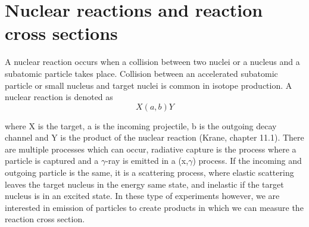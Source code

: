 \documentclass[a4paper,11pt,twoside]{book}
\begin{document}



\section{Nuclear reactions and reaction cross sections}

A nuclear reaction occurs when a collision between two nuclei or a nucleus and a subatomic particle takes place. Collision between an accelerated subatomic particle or small nucleus and target nuclei is common in isotope production. A nuclear reaction is denoted as
\begin{equation}
    X(a,b)Y
\end{equation}

\noindent where X is the target, a is the incoming projectile, b is the outgoing decay channel and Y is the product of the nuclear reaction (Krane, chapter 11.1). There are multiple processes which can occur, radiative capture is the process where a particle is captured and a $\gamma$-ray is emitted in a (x,$\gamma$) process. If the incoming and outgoing particle is the same, it is a scattering process, where elastic scattering leaves the target nucleus in the energy same state, and inelastic if the target nucleus is in an excited state. In these type of experiments however, we are interested in emission of particles to create products in which we can measure the reaction cross section. \\
\end{document}
